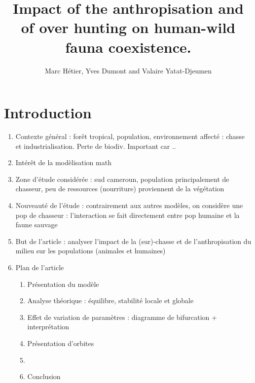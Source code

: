 \documentclass{article}
\title{Impact of the anthropisation and of over hunting on human-wild fauna coexistence.}
\author{Marc Hétier, Yves Dumont  and Valaire Yatat-Djeumen}
\newcommand{\marc}[1]{\textcolor{teal}{#1}}
\newcommand{\YD}[1]{\textcolor{magenta}{#1}}
\begin{document}
\maketitle

\section{Introduction}

\begin{enumerate}
\item Contexte général : forêt tropical, population, environnement affecté : chasse et industrialisation. Perte de biodiv. Important car ..
\item  Intérêt de la modèlisation math
\item Zone d'étude considérée : sud cameroun, population principalement de chasseur, peu de ressources (nourriture) proviennent de la végétation
\item Nouveauté de l'étude : contrairement aux autres modèles, on considère une pop de chasseur : l'interaction se fait directement entre pop humaine et la faune sauvage
\item But de l'article : analyser l'impact de la (sur)-chasse et de l'anthropisation du milieu sur les populations (animales et humaines)
\item Plan de l'article

\begin{enumerate}
\item Présentation du modèle
\item Analyse théorique : équilibre, stabilité locale et globale
\item Effet de variation de paramètres : diagramme de bifurcation + interprétation
\item Présentation d'orbites
\item 
\item Conclusion
\end{enumerate}
\end{enumerate}

\end{document}
